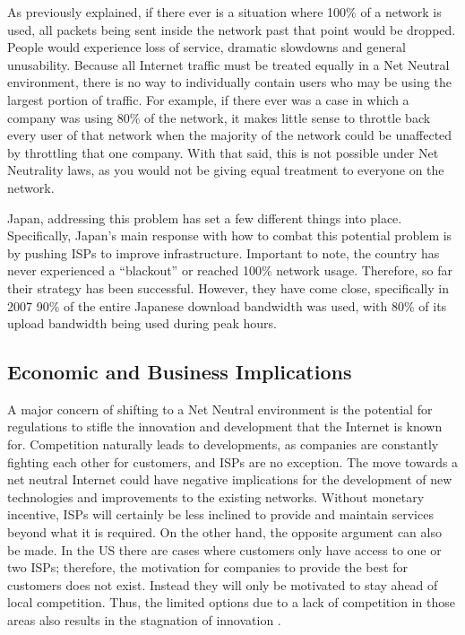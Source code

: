 \documentclass{sigcomm-alternate}
\begin{document}
As previously explained, if there ever is a situation where 100\% of a network is used, all packets being sent inside the network past that point would be dropped.  People would experience loss of service, dramatic slowdowns and general unusability.  Because all Internet traffic must be treated equally in a Net Neutral environment, there is no way to individually contain users who may be using the largest portion of traffic.  For example, if there ever was a case in which a company was using 80\% of the network, it makes little sense to throttle back every user of that network when the majority of the network could be unaffected by throttling that one company.  With that said, this is not possible under Net Neutrality laws, as you would not be giving equal treatment to everyone on the network.

Japan, addressing this problem has set a few different things into place.   Specifically, Japan’s main response with how to combat this potential problem is by pushing ISPs to improve infrastructure. Important to note, the country has never experienced a “blackout” or reached 100\% network usage.  Therefore, so far their strategy has been successful.  However, they have come close, specifically in 2007 90\% of the entire Japanese download bandwidth was used, with 80\% of its upload bandwidth being used during peak hours\cite{jitsuzumi2011japan}.



\subsection{Economic and Business Implications}

A major concern of shifting to a Net Neutral environment is the potential for regulations to stifle the innovation and development that the Internet is known for. Competition naturally leads to developments, as companies are constantly fighting each other for customers, and ISPs are no exception. The move towards a net neutral Internet could have negative implications for the development of new technologies and improvements to the existing networks. Without monetary incentive, ISPs will certainly be less inclined to provide and maintain services beyond what it is required. On the other hand, the opposite argument can also be made. In the US there are cases where customers only have access to one or two ISPs; therefore, the motivation for companies to provide the best for customers does not exist. Instead they will only be motivated to  stay ahead of local competition.  Thus, the limited options due to a lack of competition in those areas also results in the stagnation of innovation \cite{Crowcroft:2007:NNT:1198255.1198263}.
\end{document}
